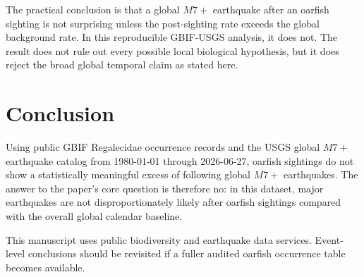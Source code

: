 \documentclass[sigconf,nonacm]{acmart}
\begin{document}
The practical conclusion is that a global $M7+$ earthquake after an oarfish sighting is not surprising unless the post-sighting rate exceeds the global background rate. In this reproducible GBIF-USGS analysis, it does not. The result does not rule out every possible local biological hypothesis, but it does reject the broad global temporal claim as stated here.

\section{Conclusion}
Using public GBIF Regalecidae occurrence records and the USGS global $M7+$ earthquake catalog from 1980-01-01 through 2026-06-27, oarfish sightings do not show a statistically meaningful excess of following global $M7+$ earthquakes. The answer to the paper's core question is therefore no: in this dataset, major earthquakes are not disproportionately likely after oarfish sightings compared with the overall global calendar baseline.

\begin{acks}
This manuscript uses public biodiversity and earthquake data services. Event-level conclusions should be revisited if a fuller audited oarfish occurrence table becomes available.
\end{acks}

\balance


\end{document}
